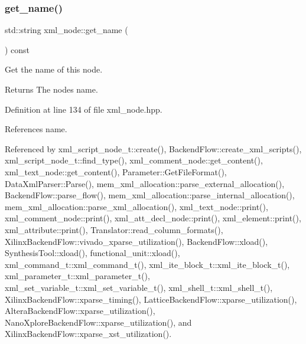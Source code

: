 \subsubsection{\texorpdfstring{get\+\_\+name()}{get\_name()}}
{\footnotesize\ttfamily std\+::string xml\+\_\+node\+::get\+\_\+name (\begin{DoxyParamCaption}{ }\end{DoxyParamCaption}) const\hspace{0.3cm}{\ttfamily [inline]}}



Get the name of this node. 

\begin{DoxyReturn}{Returns}
The node\textquotesingle{}s name. 
\end{DoxyReturn}


Definition at line 134 of file xml\+\_\+node.\+hpp.



References name.



Referenced by xml\+\_\+script\+\_\+node\+\_\+t\+::create(), Backend\+Flow\+::create\+\_\+xml\+\_\+scripts(), xml\+\_\+script\+\_\+node\+\_\+t\+::find\+\_\+type(), xml\+\_\+comment\+\_\+node\+::get\+\_\+content(), xml\+\_\+text\+\_\+node\+::get\+\_\+content(), Parameter\+::\+Get\+File\+Format(), Data\+Xml\+Parser\+::\+Parse(), mem\+\_\+xml\+\_\+allocation\+::parse\+\_\+external\+\_\+allocation(), Backend\+Flow\+::parse\+\_\+flow(), mem\+\_\+xml\+\_\+allocation\+::parse\+\_\+internal\+\_\+allocation(), mem\+\_\+xml\+\_\+allocation\+::parse\+\_\+xml\+\_\+allocation(), xml\+\_\+text\+\_\+node\+::print(), xml\+\_\+comment\+\_\+node\+::print(), xml\+\_\+att\+\_\+decl\+\_\+node\+::print(), xml\+\_\+element\+::print(), xml\+\_\+attribute\+::print(), Translator\+::read\+\_\+column\+\_\+formats(), Xilinx\+Backend\+Flow\+::vivado\+\_\+xparse\+\_\+utilization(), Backend\+Flow\+::xload(), Synthesis\+Tool\+::xload(), functional\+\_\+unit\+::xload(), xml\+\_\+command\+\_\+t\+::xml\+\_\+command\+\_\+t(), xml\+\_\+ite\+\_\+block\+\_\+t\+::xml\+\_\+ite\+\_\+block\+\_\+t(), xml\+\_\+parameter\+\_\+t\+::xml\+\_\+parameter\+\_\+t(), xml\+\_\+set\+\_\+variable\+\_\+t\+::xml\+\_\+set\+\_\+variable\+\_\+t(), xml\+\_\+shell\+\_\+t\+::xml\+\_\+shell\+\_\+t(), Xilinx\+Backend\+Flow\+::xparse\+\_\+timing(), Lattice\+Backend\+Flow\+::xparse\+\_\+utilization(), Altera\+Backend\+Flow\+::xparse\+\_\+utilization(), Nano\+Xplore\+Backend\+Flow\+::xparse\+\_\+utilization(), and Xilinx\+Backend\+Flow\+::xparse\+\_\+xst\+\_\+utilization().


